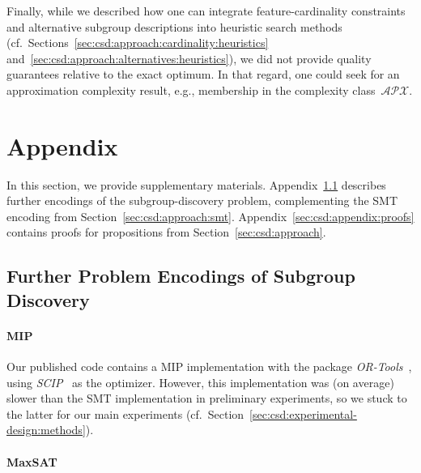 \documentclass{article}
\theoremstyle{definition}
\begin{document}
Finally, while we described how one can integrate feature-cardinality constraints and alternative subgroup descriptions into heuristic search methods (cf.~Sections~\ref{sec:csd:approach:cardinality:heuristics} and~\ref{sec:csd:approach:alternatives:heuristics}), we did not provide quality guarantees relative to the exact optimum.
In that regard, one could seek for an approximation complexity result, e.g., membership in the complexity class~$\mathcal{APX}$.


\appendix

\section{Appendix}
\label{sec:csd:appendix}

In this section, we provide supplementary materials.
Appendix~\ref{sec:csd:appendix:further-encodings} describes further encodings of the subgroup-discovery problem, complementing the SMT encoding from Section~\ref{sec:csd:approach:smt}.
Appendix~\ref{sec:csd:appendix:proofs} contains proofs for propositions from Section~\ref{sec:csd:approach}.

\subsection{Further Problem Encodings of Subgroup Discovery}
\label{sec:csd:appendix:further-encodings}

\cite{mosek2022modeling}
\cite{sinz2005towards}
\cite{ulrich2022selecting}

\paragraph{MIP}

Our published code contains a MIP implementation with the package \emph{OR-Tools}~\cite{perron2022or-tools}, using \emph{SCIP}~\cite{bestuzheva2021scip} as the optimizer.
However, this implementation was (on average) slower than the SMT implementation in preliminary experiments, so we stuck to the latter for our main experiments (cf.~Section~\ref{sec:csd:experimental-design:methods}).

\paragraph{MaxSAT}
\end{document}
